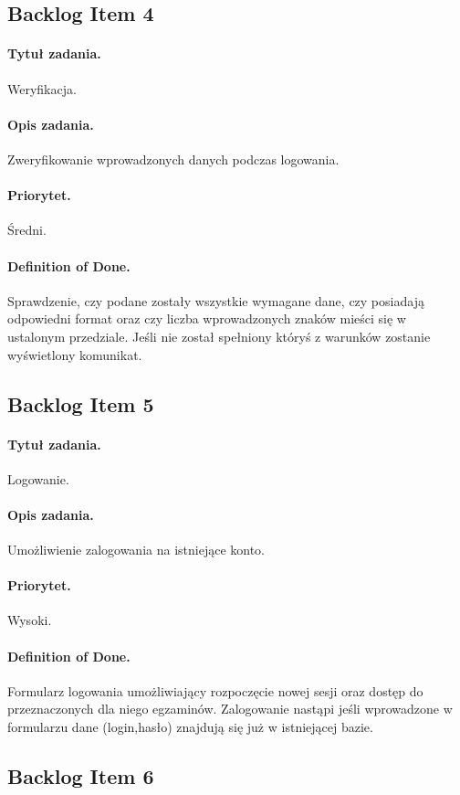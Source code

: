\documentclass[a4paper]{article}
\begin{document}
\subsection{Backlog Item 4}
\paragraph{Tytuł zadania.} Weryfikacja.
\paragraph{Opis zadania.} Zweryfikowanie wprowadzonych danych podczas logowania.
\paragraph{Priorytet.} Średni.
\paragraph{Definition of Done.} Sprawdzenie, czy podane zostały wszystkie wymagane dane, czy posiadają odpowiedni format oraz czy liczba wprowadzonych znaków mieści się w ustalonym przedziale. Jeśli nie został spełniony któryś z warunków zostanie wyświetlony komunikat.

\subsection{Backlog Item 5}
\paragraph{Tytuł zadania.} Logowanie.
\paragraph{Opis zadania.} Umożliwienie zalogowania na istniejące konto.
\paragraph{Priorytet.} Wysoki.
\paragraph{Definition of Done.} Formularz logowania umożliwiający rozpoczęcie nowej sesji oraz dostęp do przeznaczonych dla niego egzaminów. Zalogowanie nastąpi jeśli wprowadzone w formularzu dane (login,hasło) znajdują się już w istniejącej bazie.

\subsection{Backlog Item 6}
\end{document}

